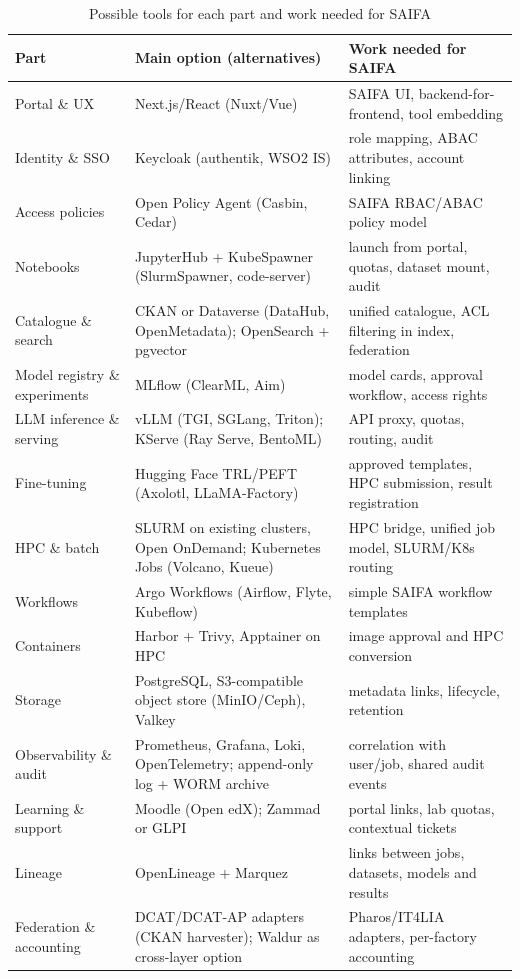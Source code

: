 \documentclass[conference,a4paper]{IEEEtran}
\begin{document}
\begin{table}[t]
\centering
\caption{Possible tools for each part and work needed for SAIFA}
\label{tab:tools}
\footnotesize
\renewcommand{\arraystretch}{1.08}
\begin{tabular}{@{}p{3.0cm}p{7.2cm}p{6.6cm}@{}}
\toprule
\textbf{Part} & \textbf{Main option (alternatives)} & \textbf{Work needed for SAIFA} \\
\midrule
Portal \& UX & Next.js/React (Nuxt/Vue) & SAIFA UI, backend-for-frontend, tool embedding \\
Identity \& SSO & Keycloak (authentik, WSO2 IS) & role mapping, ABAC attributes, account linking \\
Access policies & Open Policy Agent (Casbin, Cedar) & SAIFA RBAC/ABAC policy model \\
Notebooks & JupyterHub + KubeSpawner (SlurmSpawner, code-server) & launch from portal, quotas, dataset mount, audit \\
Catalogue \& search & CKAN or Dataverse (DataHub, OpenMetadata); OpenSearch + pgvector & unified catalogue, ACL filtering in index, federation \\
Model registry \& experiments & MLflow (ClearML, Aim) & model cards, approval workflow, access rights \\
LLM inference \& serving & vLLM (TGI, SGLang, Triton); KServe (Ray Serve, BentoML) & API proxy, quotas, routing, audit \\
Fine-tuning & Hugging Face TRL/PEFT (Axolotl, LLaMA-Factory) & approved templates, HPC submission, result registration \\
HPC \& batch & SLURM on existing clusters, Open OnDemand; Kubernetes Jobs (Volcano, Kueue) & HPC bridge, unified job model, SLURM/K8s routing \\
Workflows & Argo Workflows (Airflow, Flyte, Kubeflow) & simple SAIFA workflow templates \\
Containers & Harbor + Trivy, Apptainer on HPC & image approval and HPC conversion \\
Storage & PostgreSQL, S3-compatible object store (MinIO/Ceph), Valkey & metadata links, lifecycle, retention \\
Observability \& audit & Prometheus, Grafana, Loki, OpenTelemetry; append-only log + WORM archive & correlation with user/job, shared audit events \\
Learning \& support & Moodle (Open edX); Zammad or GLPI & portal links, lab quotas, contextual tickets \\
Lineage & OpenLineage + Marquez & links between jobs, datasets, models and results \\
Federation \& accounting & DCAT/DCAT-AP adapters (CKAN harvester); Waldur as cross-layer option & Pharos/IT4LIA adapters, per-factory accounting \\
\bottomrule
\end{tabular}
\end{table}
\end{document}
